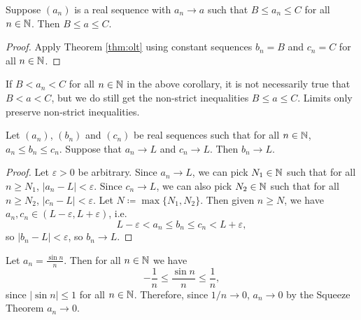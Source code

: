 \documentclass[../analysis1.tex]{subfiles}
\begin{document}
\begin{corollary}
    \begin{shaded*}
        Suppose $(a_n)$ is a real sequence with $a_n\to a$ such that $B\le a_n\le C$ for all $n\in\mathbb{N}$. Then $B\le a\le C$.
    \end{shaded*}
\end{corollary}
\begin{proof}
    Apply Theorem \ref{thm:olt} using constant sequences $b_n=B$ and $c_n=C$ for all $n\in \mathbb{N}$.\qedhere
\end{proof}
\begin{remark}
    If $B<a_n<C$ for all $n\in\mathbb{N}$ in the above corollary, it is not necessarily true that $B<a<C$, but we do still get the non-strict inequalities $B\le a\le C$. Limits only preserve non-strict inequalities.
\end{remark}

\begin{theorem}
\label{thm:squeeze}
    \begin{shaded*}
        Let $(a_n)$, $(b_n)$ and $(c_n)$ be real sequences such that for all $n\in\mathbb{N}$, $a_n\le b_n\le c_n$. Suppose that $a_n\to L$ and $c_n\to L$. Then $b_n\to L$.
    \end{shaded*}
\end{theorem}
\begin{proof}
    Let $\varepsilon>0$ be arbitrary. Since $a_n\to L$, we can pick $N_1\in\mathbb{N}$ such that for all $n\ge N_1$, $|a_n-L|<\varepsilon$. Since $c_n\to L$, we can also pick $N_2\in\mathbb{N}$ such that for all $n\ge N_2$, $|c_n-L|<\varepsilon$.
    Let $N\coloneqq \max\{N_1,N_2\}$. Then given $n\ge N$, we have $a_n,c_n\in (L-\varepsilon,L+\varepsilon)$, i.e. $$L-\varepsilon< a_n\le b_n\le c_n<L+\varepsilon,$$so $|b_n-L|<\varepsilon$, so $b_n\to L$.\qedhere
\end{proof}
\begin{example}
    Let $a_n=\frac{\sin n}{n}$. Then for all $n\in\mathbb{N}$ we have $$-\frac{1}{n}\le \frac{\sin n}{n}\le \frac{1}{n},$$since $|\sin n|\le 1$ for all $n\in\mathbb{N}$. Therefore, since $1/n\to 0$, $a_n\to 0$ by the Squeeze Theorem $a_n\to 0$.
\end{example}
\end{document}
